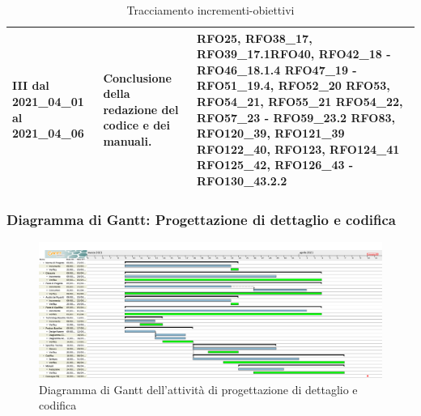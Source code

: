 \begin{table}[H]
\begin{center}
\begin{tabular}{ |C{3cm} C{6cm} C{7cm}| }
			III dal 2021\_04\_01 al 2021\_04\_06 	& 
			Conclusione della redazione del codice e dei manuali. & RFO25, RFO38\_17, RFO39\_17.1\newline RFO40,
			RFO42\_18 - RFO46\_18.1.4\newline
			RFO47\_19 - RFO51\_19.4, RFO52\_20 \newline
			RFO53, RFO54\_21, RFO55\_21 \newline
			RFO54\_22, RFO57\_23 - RFO59\_23.2 \newline
			RFO83, RFO120\_39, RFO121\_39 \newline RFO122\_40, RFO123, RFO124\_41 \newline
			RFO125\_42, RFO126\_43 - RFO130\_43.2.2 \\ \hline
		\end{tabular}
		\caption{Tracciamento incrementi-obiettivi}
	\end{center}
\end{table}

\newpage
\subsubsection{Diagramma di Gantt: Progettazione di dettaglio e codifica} \label{GanttPDettaglio}
\begin{figure}[ht]
    \centering
    \includegraphics[width=\textwidth]{Immagini/GanttProgettazioneDiDettaglioECodifica}
    \caption{Diagramma di Gantt dell'attività di progettazione di dettaglio e codifica}
\end{figure}